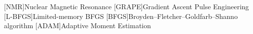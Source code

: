 \begin{acronym}[GRADIENT]
    [NMR]{Nuclear Magnetic Resonance}
    [GRAPE]{Gradient Ascent Pulse Engineering}
    [L-BFGS]{Limited-memory BFGS}
    [BFGS]{Broyden–Fletcher–Goldfarb–Shanno algorithm}
    [ADAM]{Adaptive Moment Estimation}
\end{acronym}